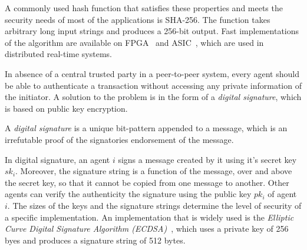 A commonly used hash function that satisfies these properties and meets the security needs of most of the applications is
SHA-256.
The function takes arbitrary long input strings and produces a 256-bit output. Fast implementations of the algorithm are 
available on FPGA~\citep{Suhaili:2017} and ASIC~\citep{Zhang:2019}, which are used in distributed real-time systems. 

In absence of a central trusted party in a peer-to-peer system, every agent should be able to authenticate a transaction without 
accessing any private information of the initiator. A solution to the problem is in the form of a {\em digital signature}, which 
is based on public key encryption. 

\begin{definition} 
	A {\em digital signature} is a unique bit-pattern appended to a message, which is an irrefutable proof of the
	signatories endorsement of the message. 
\end{definition}

In digital signature, an agent $i$ signs a message created by it using it's secret key $sk_i$. Moreover, the signature string is a 
function of the message, over and above the secret key, so that it cannot be copied from one message to another. Other agents
can verify the authenticity the signature using the public key $pk_i$ of agent $i$.  
%
The sizes of the keys and the signature strings determine the level of security of a specific implementation. An implementation 
that is widely used is the {\em Elliptic Curve Digital Signature Algorithm (ECDSA)}~\citep{Johnson:2001}, which uses a private
key of 256 byes and produces a signature string of 512 bytes.


